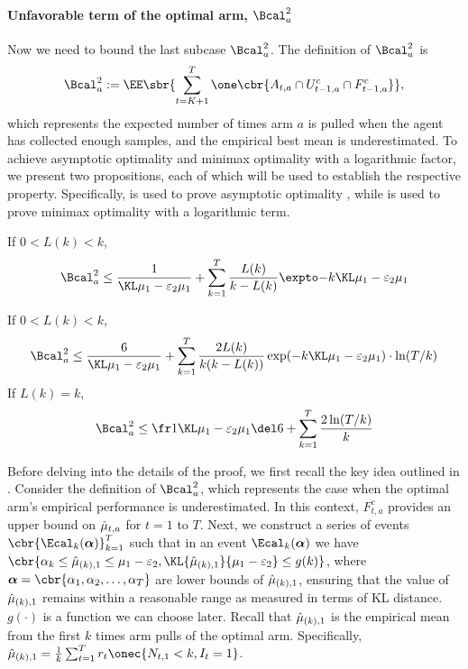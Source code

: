     \paragraph{Unfavorable term of the optimal arm, $\Bcal^2_{a}$}
    Now we need to bound the last subcase $\Bcal^2_{a}$.
    The definition of $\Bcal^2_{a}$ is
    \[
        \Bcal^2_{a} := \EE\sbr{ \sum_{t=K+1}^T
        \one\cbr{ A_{t,a} \cap
        U_{t-1,a}^c \cap
        F_{t-1,a}^c
        }
    },
    \]
    which represents the expected number of times arm $a$ is pulled when the agent has collected enough samples, and the empirical best mean is underestimated.
    To achieve asymptotic optimality and minimax optimality with a logarithmic factor, we present two propositions, each of which will be used to establish the respective property.
    Specifically,  is used to prove asymptotic optimality \expklms, while  is used to prove minimax optimality with a logarithmic term.
    
    \begin{proposition} \label{pro:bad-2-ao}
        If $0 < L(k) < k$,
        \begin{align}
            \Bcal^2_{a} \leq \ExpFThreeAO
                \label{eqn:bad-2-ao}
        \end{align}
        
    \end{proposition}

    \begin{proposition} \label{pro:bad-2-mo}
    If $ 0 < L(k) < k$,
        \begin{align}
            \Bcal^2_{a} \leq \ExpFThreeMO
                \label{eqn:bad-2-mo}
        \end{align}
    If $L(k) = k$,
        \begin{align}
            \Bcal^2_a \leq \IdentityLBadCaseTwoMO
                \label{eqn:bad-2-ao-corner}
        \end{align}
    \end{proposition}

    Before delving into the details of the proof, we first recall the key idea outlined in .
    Consider the definition of $\Bcal^2_a$, which represents the case when the optimal arm's empirical performance is underestimated. In this context, $F^c_{t, a}$ provides an upper bound on ${\hat\mu}_{t, a}$ for $t = 1$ to $T$. 
    Next, we construct a series of events $\cbr{\Ecal_k(\boldsymbol{\alpha})}_{k=1}^T$ such that in an event $\Ecal_k(\boldsymbol{\alpha})$ we have $\cbr{\alpha_k \leq \hmu_{(k) , 1} \leq \mu_1-\varepsilon_2, \KL{\hmu_{(k), 1}}{\mu_1-\varepsilon_2} \leq g(k)}$, where $\boldsymbol{\alpha} = \cbr{\alpha_1, \alpha_2, \dots, \alpha_T}$ are lower bounds of ${\hat\mu}_{(k), 1}$, ensuring that the value of ${\hat\mu}_{(k), 1}$ remains within a reasonable range as measured in terms of KL distance. $g(\cdot)$ is a function we can choose later.
    Recall that ${\hat\mu}_{(k),1}$ is the empirical mean from the first $k$ times arm pulls of the optimal arm. Specifically, $\hmu_{(k), 1} = \tfrac{1}{k} \sum_{t=1}^T r_t \onec{N_{t, 1} < k, I_t = 1}$.

